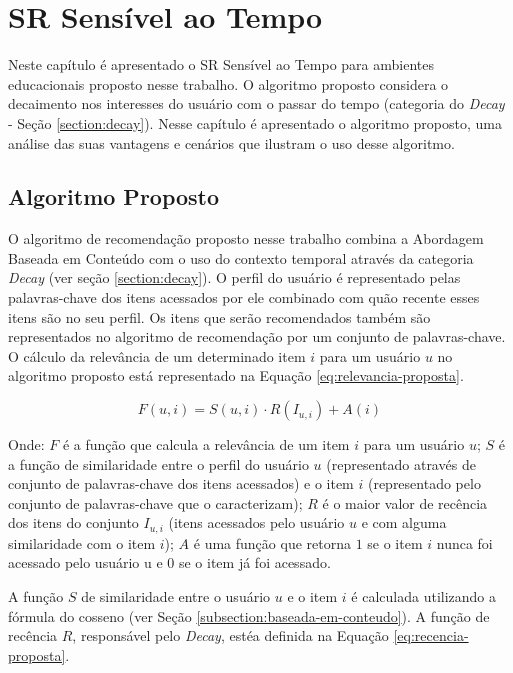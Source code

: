 \chapter{SR Sensível ao Tempo}\label{chapter:proposta}

Neste capítulo é apresentado o SR Sensível ao Tempo para ambientes educacionais proposto nesse trabalho. O algoritmo proposto
considera o decaimento nos interesses do usuário com o passar do tempo (categoria do \textit{Decay} - Seção \ref{section:decay}). Nesse capítulo é apresentado
o algoritmo proposto, uma análise das suas vantagens e cenários que ilustram o uso desse algoritmo.

\section{Algoritmo Proposto}\label{section:algoritmo-proposto}

O algoritmo de recomendação proposto nesse trabalho combina a Abordagem Baseada em Conteúdo com o uso do
contexto temporal através da categoria \textit{Decay} (ver seção \ref{section:decay}). O perfil do usuário é representado
pelas palavras-chave dos itens acessados por ele combinado com quão recente esses itens são no seu perfil. Os itens que serão
recomendados também são representados no algoritmo de recomendação por um conjunto de palavras-chave. O cálculo da
relevância de um determinado item $i$ para um usuário $u$ no algoritmo proposto está representado na Equação \ref{eq:relevancia-proposta}.

\begin{equation}
  F(u,i) = S(u,i) \cdot R(I_{u,i}) + A(i)
  \label{eq:relevancia-proposta}
\end{equation}

Onde: $F$ é a função que calcula a relevância de um item $i$ para um usuário $u$; $S$ é a função de similaridade entre
o perfil do usuário $u$ (representado através de conjunto de palavras-chave dos itens acessados) e o item $i$
(representado pelo conjunto de palavras-chave que o caracterizam); $R$ é o maior valor de recência dos itens do conjunto
$I_{u,i}$ (itens acessados pelo usuário $u$ e com alguma similaridade com o item $i$); $A$ é uma função que retorna $1$
se o item $i$ nunca foi acessado pelo usuário u e $0$ se o item já foi acessado.

A função $S$ de similaridade entre o usuário $u$ e o item $i$ é calculada utilizando a fórmula do cosseno (ver Seção
\ref{subsection:baseada-em-conteudo}). A função de recência $R$, responsável pelo \textit{Decay}, estéa definida na Equação
\ref{eq:recencia-proposta}.

